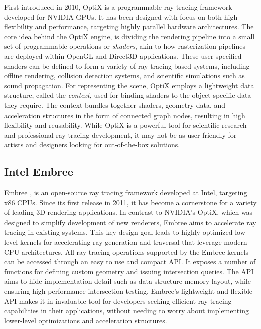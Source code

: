 First introduced in 2010, OptiX \supercite{Parker2010} is a programmable ray tracing framework developed for NVIDIA GPUs.
It has been designed with focus on both high flexibility and performance, targeting highly parallel hardware architectures.
The core idea behind the OptiX engine, is dividing the rendering pipeline into a small set of programmable operations or \textit{shaders}, akin to how rasterization pipelines are deployed within OpenGL and Direct3D applications.
These user-specified shaders can be defined to form a variety of ray tracing-based systems, including offline rendering, collision detection systems, and scientific simulations such as sound propagation.
For representing the scene, OptiX employs a lightweight data structure, called the \textit{context}, used for binding shaders to the object-specific data they require.
The context bundles together shaders, geometry data, and acceleration structures in the form of connected graph nodes, resulting in high flexibility and reusability.
While OptiX is a powerful tool for scientific research and professional ray tracing development, it may not be as user-friendly for artists and designers looking for out-of-the-box solutions.

\subsection{Intel Embree}

Embree \supercite{Wald2014}, is an open-source ray tracing framework developed at Intel, targeting x86 CPUs. 
Since its first release in 2011, it has become a cornerstone for a variety of leading 3D rendering applications. 
In contrast to NVIDIA's OptiX, which was designed to simplify development of new renderers, Embree aims to accelerate ray tracing in existing systems. 
This key design goal leads to highly optimized low-level kernels for accelerating ray generation and traversal that leverage modern CPU architectures.
All ray tracing operations supported by the Embree kernels can be accessed through an easy to use and compact API.
It exposes a number of functions for defining custom geometry and issuing intersection queries. 
The API aims to hide implementation detail such as data structure memory layout, while ensuring high performance intersection testing. 
Embree's lightweight and flexible API makes it in invaluable tool for developers seeking efficient ray tracing capabilities in their applications, without needing to worry about implementing lower-level optimizations and acceleration structures.

